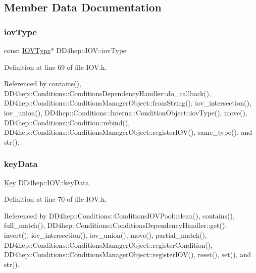 \subsection{Member Data Documentation}
\hypertarget{class_d_d4hep_1_1_i_o_v_a885a5ed2be528cf1db783cade2a0b838}{}\label{class_d_d4hep_1_1_i_o_v_a885a5ed2be528cf1db783cade2a0b838} 
\subsubsection{\texorpdfstring{iov\+Type}{iovType}}
{\footnotesize\ttfamily const \hyperlink{class_d_d4hep_1_1_i_o_v_type}{I\+O\+V\+Type}$\ast$ D\+D4hep\+::\+I\+O\+V\+::iov\+Type}



Definition at line 69 of file I\+O\+V.\+h.



Referenced by contains(), D\+D4hep\+::\+Conditions\+::\+Conditions\+Dependency\+Handler\+::do\+\_\+callback(), D\+D4hep\+::\+Conditions\+::\+Conditions\+Manager\+Object\+::from\+String(), iov\+\_\+intersection(), iov\+\_\+union(), D\+D4hep\+::\+Conditions\+::\+Interna\+::\+Condition\+Object\+::iov\+Type(), move(), D\+D4hep\+::\+Conditions\+::\+Condition\+::rebind(), D\+D4hep\+::\+Conditions\+::\+Conditions\+Manager\+Object\+::register\+I\+O\+V(), same\+\_\+type(), and str().

\hypertarget{class_d_d4hep_1_1_i_o_v_a28eb02fd8d9c45b770e6a234303991de}{}\label{class_d_d4hep_1_1_i_o_v_a28eb02fd8d9c45b770e6a234303991de} 
\subsubsection{\texorpdfstring{key\+Data}{keyData}}
{\footnotesize\ttfamily \hyperlink{class_d_d4hep_1_1_i_o_v_a07cb46dc875296dc9cccf4ff370104ae}{Key} D\+D4hep\+::\+I\+O\+V\+::key\+Data}



Definition at line 70 of file I\+O\+V.\+h.



Referenced by D\+D4hep\+::\+Conditions\+::\+Conditions\+I\+O\+V\+Pool\+::clean(), contains(), full\+\_\+match(), D\+D4hep\+::\+Conditions\+::\+Conditions\+Dependency\+Handler\+::get(), invert(), iov\+\_\+intersection(), iov\+\_\+union(), move(), partial\+\_\+match(), D\+D4hep\+::\+Conditions\+::\+Conditions\+Manager\+Object\+::register\+Condition(), D\+D4hep\+::\+Conditions\+::\+Conditions\+Manager\+Object\+::register\+I\+O\+V(), reset(), set(), and str().

